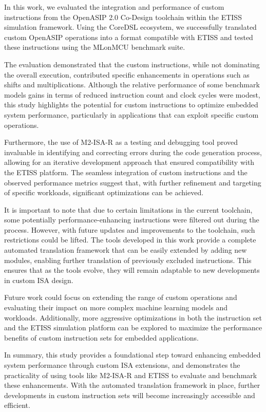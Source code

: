 In this work, we evaluated the integration and performance of custom instructions from the OpenASIP 2.0 Co-Design toolchain within the ETISS simulation framework. Using the CoreDSL ecosystem, we successfully translated custom OpenASIP operations into a format compatible with ETISS and tested these instructions using the MLonMCU benchmark suite.

The evaluation demonstrated that the custom instructions, while not dominating the overall execution, contributed specific enhancements in operations such as shifts and multiplications. Although the relative performance of some benchmark models gains in terms of reduced instruction count and clock cycles were modest, this study highlights the potential for custom instructions to optimize embedded system performance, particularly in applications that can exploit specific custom operations.

Furthermore, the use of M2-ISA-R as a testing and debugging tool proved invaluable in identifying and correcting errors during the code generation process, allowing for an iterative development approach that ensured compatibility with the ETISS platform. The seamless integration of custom instructions and the observed performance metrics suggest that, with further refinement and targeting of specific workloads, significant optimizations can be achieved.

It is important to note that due to certain limitations in the current toolchain, some potentially performance-enhancing instructions were filtered out during the process. However, with future updates and improvements to the toolchain, such restrictions could be lifted. The tools developed in this work provide a complete automated translation framework that can be easily extended by adding new modules, enabling further translation of previously excluded instructions. This ensures that as the tools evolve, they will remain adaptable to new developments in custom ISA design.

Future work could focus on extending the range of custom operations and evaluating their impact on more complex machine learning models and workloads. Additionally, more aggressive optimizations in both the instruction set and the ETISS simulation platform can be explored to maximize the performance benefits of custom instruction sets for embedded applications.

In summary, this study provides a foundational step toward enhancing embedded system performance through custom ISA extensions, and demonstrates the practicality of using tools like M2-ISA-R and ETISS to evaluate and benchmark these enhancements. With the automated translation framework in place, further developments in custom instruction sets will become increasingly accessible and efficient.
